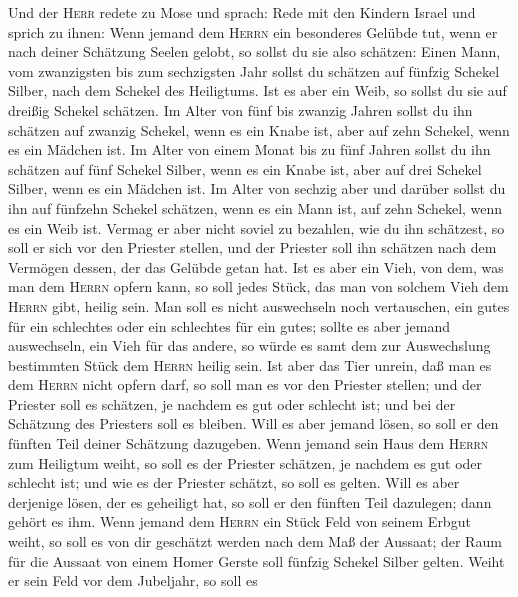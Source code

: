  Und der \textsc{Herr} redete zu Mose und sprach: Rede mit
den Kindern Israel und sprich zu ihnen:  Wenn jemand dem
\textsc{Herrn} ein besonderes Gelübde tut, wenn er nach deiner Schätzung
Seelen gelobt,  so sollst du sie also schätzen: Einen
Mann, vom zwanzigsten bis zum sechzigsten Jahr sollst du schätzen auf
fünfzig Schekel Silber, nach dem Schekel des Heiligtums. 
Ist es aber ein Weib, so sollst du sie auf dreißig Schekel schätzen.
 Im Alter von fünf bis zwanzig Jahren sollst du ihn
schätzen auf zwanzig Schekel, wenn es ein Knabe ist, aber auf zehn
Schekel, wenn es ein Mädchen ist.  Im Alter von einem
Monat bis zu fünf Jahren sollst du ihn schätzen auf fünf Schekel Silber,
wenn es ein Knabe ist, aber auf drei Schekel Silber, wenn es ein Mädchen
ist.  Im Alter von sechzig aber und darüber sollst du ihn
auf fünfzehn Schekel schätzen, wenn es ein Mann ist, auf zehn Schekel,
wenn es ein Weib ist.  Vermag er aber nicht soviel zu
bezahlen, wie du ihn schätzest, so soll er sich vor den Priester
stellen, und der Priester soll ihn schätzen nach dem Vermögen dessen,
der das Gelübde getan hat.  Ist es aber ein Vieh, von dem,
was man dem \textsc{Herrn} opfern kann, so soll jedes Stück, das man von
solchem Vieh dem \textsc{Herrn} gibt, heilig sein.  Man
soll es nicht auswechseln noch vertauschen, ein gutes für ein schlechtes
oder ein schlechtes für ein gutes; sollte es aber jemand auswechseln,
ein Vieh für das andere, so würde es samt dem zur Auswechslung
bestimmten Stück dem \textsc{Herrn} heilig sein.  Ist
aber das Tier unrein, daß man es dem \textsc{Herrn} nicht opfern darf,
so soll man es vor den Priester stellen;  und der
Priester soll es schätzen, je nachdem es gut oder schlecht ist; und bei
der Schätzung des Priesters soll es bleiben.  Will es
aber jemand lösen, so soll er den fünften Teil deiner Schätzung
dazugeben.  Wenn jemand sein Haus dem \textsc{Herrn} zum
Heiligtum weiht, so soll es der Priester schätzen, je nachdem es gut
oder schlecht ist; und wie es der Priester schätzt, so soll es gelten.
 Will es aber derjenige lösen, der es geheiligt hat, so
soll er den fünften Teil dazulegen; dann gehört es ihm. 
Wenn jemand dem \textsc{Herrn} ein Stück Feld von seinem Erbgut weiht,
so soll es von dir geschätzt werden nach dem Maß der Aussaat; der Raum
für die Aussaat von einem Homer Gerste soll fünfzig Schekel Silber
gelten.  Weiht er sein Feld vor dem Jubeljahr, so soll es
